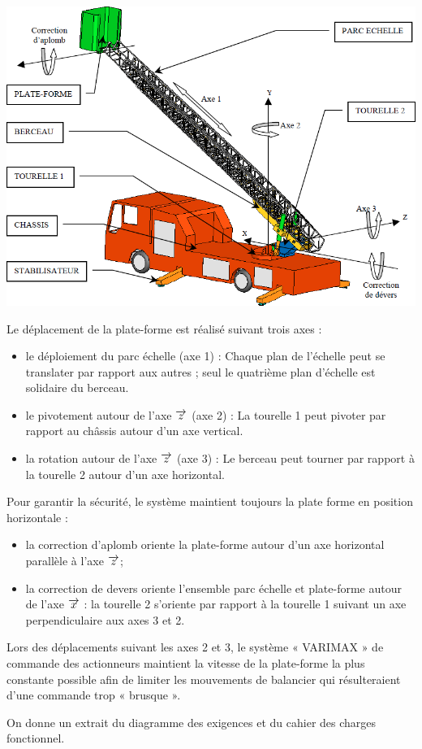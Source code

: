 \documentclass[10pt,oneside]{article}
\begin{document}
{\begin{center}
\includegraphics[width=.8\textwidth]{png/fig2}
\end{center}
Le déplacement de la plate-forme est réalisé suivant trois axes :
\begin{itemize}
\item le déploiement du parc échelle (axe 1) : Chaque plan de l’échelle peut se translater par
rapport aux autres ; seul le quatrième plan d’échelle est solidaire du berceau.
\item le pivotement autour de l’axe $\overrightarrow{z}$ (axe 2) : La tourelle 1 peut pivoter par rapport au
châssis autour d’un axe vertical.
\item la rotation autour de l’axe $\overrightarrow{z}$ (axe 3) : Le berceau peut tourner par rapport à la tourelle
2 autour d’un axe horizontal.
\end{itemize}
Pour garantir la sécurité, le système maintient toujours la plate forme en position horizontale :
\begin{itemize}
\item la correction d’aplomb oriente la plate-forme autour d’un axe horizontal parallèle à
l’axe $\overrightarrow{z}$;
\item la correction de devers oriente l’ensemble parc échelle et plate-forme autour de l’axe
$\overrightarrow{x}$ : la tourelle 2 s’oriente par rapport à la tourelle 1 suivant un axe perpendiculaire aux
axes 3 et 2.
\end{itemize}
Lors des déplacements suivant les axes 2 et 3, le système « VARIMAX » de commande des
actionneurs maintient la vitesse de la plate-forme la plus constante possible afin de limiter les
mouvements de balancier qui résulteraient d’une commande trop « brusque ».

On donne un extrait du diagramme des exigences et du cahier des charges fonctionnel.

}
\end{document}
